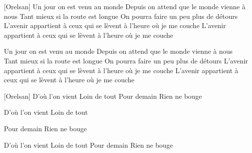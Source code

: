 [Orelsan]
Un jour on est venu au monde
Depuis on attend que le monde vienne à nous
Tant mieux si la route est longue
On pourra faire un peu plus de détours
L'avenir appartient à ceux qui se lèvent à l'heure où je me couche
L'avenir appartient à ceux qui se lèvent à l'heure où je me couche


Un jour on est venu au monde
Depuis on attend que le monde vienne à nous
Tant mieux si la route est longue
On pourra faire un peu plus de détours
L'avenir appartient à ceux qui se lèvent à l'heure où je me couche
L'avenir appartient à ceux qui se lèvent à l'heure où je me couche

[Orelsan]
D'où l'on vient
Loin de tout
Pour demain
Rien ne bouge

D'où l'on vient
Loin de tout

Pour demain
Rien ne bouge

D'où l'on vient
Loin de tout
Pour demain
Rien ne bouge 